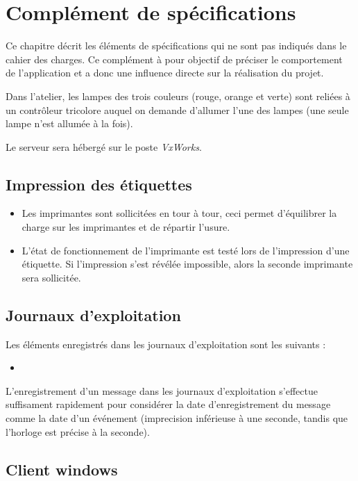 \chapter{Complément de spécifications}

Ce chapitre décrit les éléments de spécifications qui ne sont pas indiqués dans
le cahier des charges. Ce complément à pour objectif de préciser le
comportement de l'application et a donc une influence directe sur la
réalisation du projet.

Dans l'atelier, les lampes des trois couleurs (rouge, orange et verte) sont
reliées à un contrôleur tricolore auquel on demande d'allumer l'une des lampes
(une seule lampe n'est allumée à la fois).

Le serveur sera hébergé sur le poste \textit{VxWorks}.

\section{Impression des étiquettes}

\begin{itemize}
	\item Les imprimantes sont sollicitées en tour à tour, ceci permet
d'équilibrer la charge sur les imprimantes et de répartir l'usure.
	\item L'état de fonctionnement de l'imprimante est testé lors de
l'impression d'une étiquette. Si l'impression s'est révélée impossible, alors
la seconde imprimante sera sollicitée.
\end{itemize}

\section{Journaux d'exploitation}

Les éléments enregistrés dans les journaux d'exploitation sont les suivants :

\begin{itemize}
	\item 
\end{itemize}

L'enregistrement d'un message dans les journaux d'exploitation s'effectue
suffisament rapidement pour considérer la date d'enregistrement du message
comme la date d'un événement (imprecision inférieuse à une seconde, tandis que
l'horloge est précise à la seconde).

\section{Client windows}

